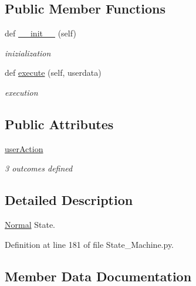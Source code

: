 \subsection*{Public Member Functions}
\begin{DoxyCompactItemize}
\item 
\mbox{\label{classState__Machine_1_1Normal_a517934b733d96f1a1bb530412f42da15}} 
def \hyperlink{classState__Machine_1_1Normal_a517934b733d96f1a1bb530412f42da15}{\+\_\+\+\_\+init\+\_\+\+\_\+} (self)
\begin{DoxyCompactList}\small\item\em inizialization \end{DoxyCompactList}\item 
\mbox{\label{classState__Machine_1_1Normal_aad25695eb358f21389fcf7122070dae4}} 
def \hyperlink{classState__Machine_1_1Normal_aad25695eb358f21389fcf7122070dae4}{execute} (self, userdata)
\begin{DoxyCompactList}\small\item\em execution \end{DoxyCompactList}\end{DoxyCompactItemize}
\subsection*{Public Attributes}
\begin{DoxyCompactItemize}
\item 
\hyperlink{classState__Machine_1_1Normal_a390f2d9125adec1edb43339a27bd256e}{user\+Action}
\begin{DoxyCompactList}\small\item\em 3 outcomes defined \end{DoxyCompactList}\end{DoxyCompactItemize}


\subsection{Detailed Description}
\hyperlink{classState__Machine_1_1Normal}{Normal} State. 

Definition at line 181 of file State\+\_\+\+Machine.\+py.



\subsection{Member Data Documentation}
\mbox{\label{classState__Machine_1_1Normal_a390f2d9125adec1edb43339a27bd256e}} 
